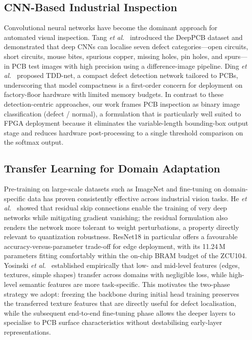 \documentclass[conference]{IEEEtran}
\begin{document}
\subsection{CNN-Based Industrial Inspection}
Convolutional neural networks have become the dominant approach for automated visual inspection. Tang \emph{et al.}~\cite{tang2019deeppcb} introduced the DeepPCB dataset and demonstrated that deep CNNs can localise seven defect categories---open circuits, short circuits, mouse bites, spurious copper, missing holes, pin holes, and spurs---in PCB test images with high precision using a difference-image pipeline. Ding \emph{et al.}~\cite{ding2019cnn} proposed TDD-net, a compact defect detection network tailored to PCBs, underscoring that model compactness is a first-order concern for deployment on factory-floor hardware with limited memory budgets. In contrast to these detection-centric approaches, our work frames PCB inspection as binary image classification (defect / normal), a formulation that is particularly well suited to FPGA deployment because it eliminates the variable-length bounding-box output stage and reduces hardware post-processing to a single threshold comparison on the softmax output.

\subsection{Transfer Learning for Domain Adaptation}
Pre-training on large-scale datasets such as ImageNet and fine-tuning on domain-specific data has proven consistently effective across industrial vision tasks. He \emph{et al.}~\cite{he2016resnet} showed that residual skip connections enable the training of very deep networks while mitigating gradient vanishing; the residual formulation also renders the network more tolerant to weight perturbations, a property directly relevant to quantization robustness. ResNet18 in particular offers a favourable accuracy-versus-parameter trade-off for edge deployment, with its 11.24\,M parameters fitting comfortably within the on-chip BRAM budget of the ZCU104. Yosinski \emph{et al.}~\cite{yosinski2014transferable} established empirically that low- and mid-level features (edges, textures, simple shapes) transfer across domains with negligible loss, while high-level semantic features are more task-specific. This motivates the two-phase strategy we adopt: freezing the backbone during initial head training preserves the transferred texture features that are directly useful for defect localisation, while the subsequent end-to-end fine-tuning phase allows the deeper layers to specialise to PCB surface characteristics without destabilising early-layer representations.
\end{document}
